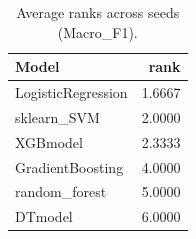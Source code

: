 \begin{table}[t]
\centering
\begin{tabular}{lr}
\toprule
Model & rank \\
\midrule
LogisticRegression & 1.6667 \\
sklearn_SVM & 2.0000 \\
XGBmodel & 2.3333 \\
GradientBoosting & 4.0000 \\
random_forest & 5.0000 \\
DTmodel & 6.0000 \\
\bottomrule
\end{tabular}
\caption{Average ranks across seeds (Macro_F1).}
\label{tab:avg_rank_Macro_F1}
\end{table}